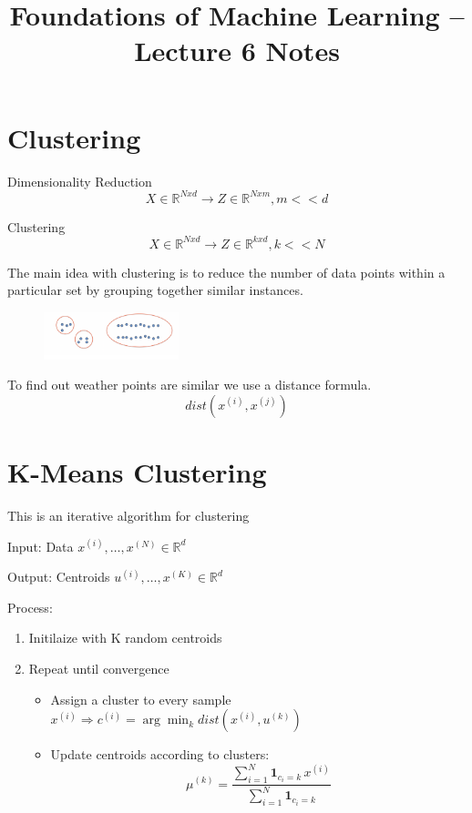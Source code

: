 \documentclass[11pt]{article}
\title{Foundations of Machine Learning -- Lecture 6 Notes}
\author{}
\date{}
\begin{document}
\maketitle

\section*{Clustering}

Dimensionality Reduction
\[
	X \in \mathbb{R}^{Nxd} \rightarrow Z \in \mathbb{R}^{Nxm}, m << d
\]

Clustering
\[
	X \in \mathbb{R}^{Nxd} \rightarrow Z \in \mathbb{R}^{kxd}, k << N
\]

The main idea with clustering is to reduce the number of data points within a particular set by grouping together similar instances.

\begin{figure}[h]
	\centering
	\includegraphics[width=0.35\textwidth]{../imgs/clust-exam.png} %
\end{figure}

To find out weather points are similar we use a distance formula.
\[
	dist(x^{(i)}, x^{(j)})
\]

\section*{K-Means Clustering}

This is an iterative algorithm for clustering
\medskip

Input: Data ${x^{(i)},\dots,x^{(N)} \in \mathbb{R}^d}$
\medskip

Output: Centroids ${u^{(i)},\dots,x^{(K)} \in \mathbb{R}^d}$
\medskip

Process:
\begin{enumerate}
	\item Initilaize with K random centroids
	\item Repeat until convergence
	      \begin{itemize}
		      \item Assign a cluster to every sample $x^{(i)} \Rightarrow c^{(i)} = \arg\min_k dist(x^{(i)}, u^{(k)})$
		      \item Update centroids according to clusters: \[
			            \mu^{(k)} =
			            \frac{\displaystyle \sum_{i=1}^{N} \mathbf{1}_{c_i = k} \, x^{(i)}}
			            {\displaystyle \sum_{i=1}^{N} \mathbf{1}_{c_i = k}}
		            \]

	      \end{itemize}
\end{enumerate}
\end{document}
